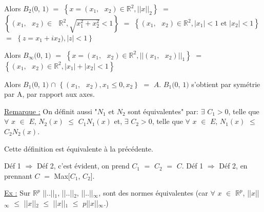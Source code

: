 \documentclass{article}
\begin{document}
\begin{multicols}{2}

\parindent=1.5cm
Alors $B_{2}(0$, $1)$ $=$ $\left\{x=(x_1,\text{ }x_2) \in \mathbb{R}^2,||x||_{2} \right\}$ \smallbreak $=$ $\left\{(x_1,\text{ }x_2) \in \text{ }\mathbb{R}^2,\sqrt{x_{1}^2 + x_{2}^2} <1 \right\}$
\smallbreak
$=$ $\left\{(x_1,\text{ }x_2) \in \mathbb{R}^2,|x_1| < 1 \text{ et } |x_2| < 1 \right\}$ \smallbreak
$=$ $\left\{z = x_1 + ix_2) ,|z| < 1 \right\}$
\columnbreak

\Boulequatre
\end{multicols}
\parindent=1.5cm
\smallbreak
Alors $B_{\infty}(0$, $1)$ $=$ $\left\{x=(x_1,\text{ }x_2) \in \mathbb{R}^2,||(x_1,\text{ }x_2)||_{1} \right\}$ $=$ $\left\{(x_1,\text{ }x_2) \in \mathbb{R}^2,|x_1| + |x_2| < 1 \right\}$
\begin{multicols}{2}

\parindent=1.5cm
Alors $B_{1}(0$, $1)$ $\cap$ $\left\{(x_1,\text{ }x_2), x_1 \leqslant 0, x_2 \right\}$ $=$ $A$. \smallbreak $B_{1}(0$, $1)$ s'obtient par symétrie par A, par \smallbreak rapport aux axes.
\smallbreak
\hspace{1cm}
\smallbreak
\hspace{1cm}
\smallbreak
\columnbreak

\Boulecinq
\end{multicols}
\parindent=0cm
\smallbreak
{}
\smallbreak
\underline{Remarque :} \smallbreak
On définit aussi "$N_1$ et $N_2$ sont équivalentes" par:
\parindent=1cm
\smallbreak
$\exists$ $C_1>0$, telle que $\forall$ $x$ $\in$ $E$, $N_2(x)$ $\leqslant$ $C_1 N_1(x)$ et,
$\exists$ $C_2>0$, telle que $\forall$ $x$ $\in$ $E$, $N_1(x)$ $\leqslant$ $C_2 N_2(x)$.

\parindent=1cm
\smallbreak
Cette définition est équivalente à la précédente. 

Déf 1 $\Longrightarrow$ Déf 2, c'est évident, on prend $C_1$ $=$ $C_2$ $=$ $C$. Déf 1 $\Longrightarrow$ Déf 2, en prennant $C$ $=$ Max[$C_1$, $C_2$].
\parindent=0cm

\underline{Ex :}
Sur $\mathbb{R}^p$ ||..||$_1$, ||..||$_2$, ||..||$_{\infty}$, sont des normes équivalentes (car $\forall$ $x$ $\in$ $\mathbb{R}^p$, ||$x$||$_{\infty}$ $\leqslant$ ||$x$||$_2$ $\leqslant$ ||$x$||$_1$ $\leqslant$ $p$||$x$||$_{\infty}$.)
\end{document}
